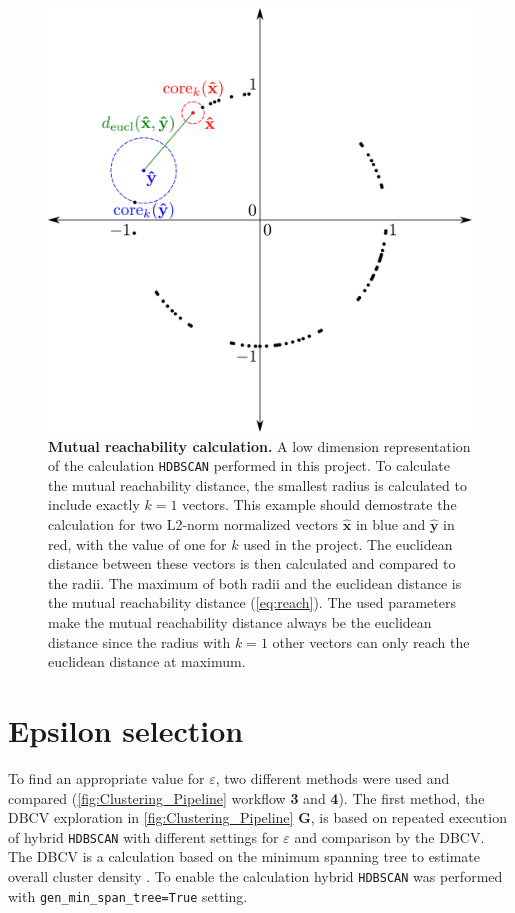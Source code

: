 \begin{figure}[!hbt]
    \centering
    \includegraphics[width=\textwidth]{Graphics/HDB.pdf}
    \caption[Mutual reachability calculation]{\textbf{Mutual reachability calculation.} A low dimension representation of the calculation \texttt{HDBSCAN} performed in this project. To calculate the mutual reachability distance, the smallest radius is calculated to include exactly $k = 1$ vectors. This example should demostrate the calculation for two L2-norm normalized vectors $\mathbf{\hat{x}}$ in blue and $\mathbf{\hat{y}}$ in red, with the value of one for $k$ used in the project. The euclidean distance between these vectors is then calculated and compared to the radii. The maximum of both radii and the euclidean distance is the mutual reachability distance (\autoref{eq:reach}). The used parameters make the mutual reachability distance always be the euclidean distance since the radius with $k=1$ other vectors can only reach the euclidean distance at maximum.}
    \label{fig:HDB}
\end{figure}

\section{Epsilon selection} \label{sec:epsilon}

To find an appropriate value for $\varepsilon$, two different methods were used and compared (\autoref{fig:Clustering_Pipeline} workflow \textsf{\textbf{3}} and \textsf{\textbf{4}}). The first method, the \gls{DBCV} exploration in \autoref{fig:Clustering_Pipeline} \textsf{\textbf{G}}, is based on repeated execution of hybrid \texttt{HDBSCAN} with different settings for $\varepsilon$ and comparison by the \gls{DBCV}. The \gls{DBCV} is a calculation based on the minimum spanning tree to estimate overall cluster density \autocite{moulavi_density-based_2014}. To enable the calculation hybrid \texttt{HDBSCAN} was performed with \texttt{gen\_min\_span\_tree=True} setting.

